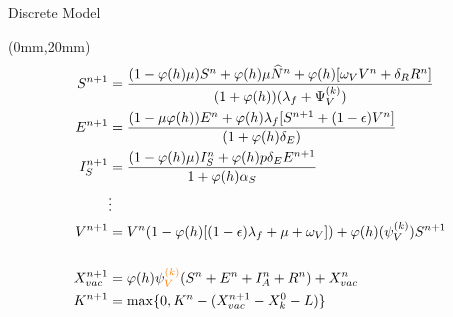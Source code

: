 %
\begin{frame}{Discrete Model}
    \begin{textblock*}{120mm}(0mm,20mm)
     \begin{align*}
        S^{n+1} &=
            \frac{
                (1-\varphi(h) \mu) S^n
                + \varphi(h)\mu \widehat{N}^n
                + \varphi(h)[
                    \omega_V V^n
                    + \delta_R R^n
                ]}{
                        (1 + \varphi(h))
                        (\lambda_f + \Psi_V^{(k)})
            }
         \\
         E^{n+1}
             &=
             \frac{
                 (1- \mu \varphi(h)) E^n
                 + \varphi(h) \lambda_f
                 [
                     S^{n+1} + (1- \epsilon) V^n
                 ]
             }{
                 (1 + \varphi(h)
                 \delta_E)
             }
         \\
     I_S^{n+1}
     &=
         \frac{
             (1 -\varphi(h) \mu) I_S^n
             + \varphi(h) p \delta_E E^{n+1}
         }{
             1 + \varphi(h) \alpha_S
         }
      \\
      &\vdots
      \\
      V^{n+1} &= V^n(1-\varphi(h)[(1 - \epsilon )\lambda_f + \mu + \omega _V]) +
           \varphi(h)(\psi_V^{(k)}) S^{n+1}
      \\
      \\
      X_{vac}^{n+1} &=
               \varphi(h) \psi_V^{\color{orange}{(k)}}
               (S^n + E^n + I_A^n + R^n)
               + X_{vac}^n
      \\
            K^{n+1} &=
                \max \{0, K^n - (X_{vac}^{n+1} - X_k^0 -L)\}
     \end{align*}
    \end{textblock*}
\end{frame}

